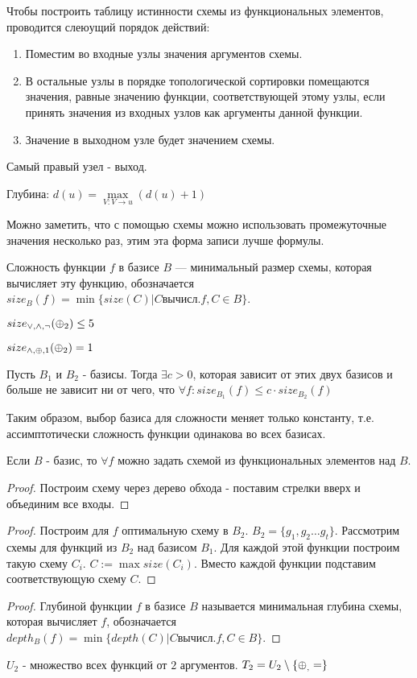 Чтобы построить таблицу истинности схемы из функциональных элементов, проводится слеюущий порядок действий:

\begin{enumerate}
\item Поместим во входные узлы значения аргументов схемы.
\item В остальные узлы в порядке топологической сортировки помещаются значения, равные значению функции, соответствующей этому узлы, если принять значения из входных узлов как аргументы данной функции.
\item Значение в выходном узле будет значением схемы.
\end{enumerate}


Самый правый узел - выход.

Глубина: $d(u)=\max\limits_{V:V\to u} (d(u)+1)$

Можно заметить, что с помощью схемы можно использовать промежуточные значения несколько раз, этим эта форма записи лучше формулы.

\begin{definition}
    Сложность функции $f$ в базисе $B$ --- минимальный размер схемы, которая вычисляет эту функцию, обозначается $size_B(f)=\min\{size(C)|C \text{вычисл.} f, C\in B\}$.
\end{definition}

$size_{\vee,\wedge,\neg}(\operatorname*{\oplus}_2)\leq 5$

$size_{\wedge,\operatorname*{\oplus},1}(\operatorname*{\oplus}_2)=1$

\begin{theorem}
    Пусть $B_1$ и $B_2$ - базисы. Тогда $\exists c>0$, которая зависит от этих двух базисов и больше не зависит ни от чего, что $\forall f : size_{B_1}(f)\leq c\cdot size_{B_2}(f)$
\end{theorem}

Таким образом, выбор базиса для сложности меняет только константу, т.е. ассимптотически сложность функции одинакова во всех базисах.

\begin{lemma}
    Если $B$ - базис, то $\forall f$ можно задать схемой из функциональных элементов над $B$.
\end{lemma}

\begin{proof}
    Построим схему через дерево обхода - поставим стрелки вверх и объединим все входы.
\end{proof}

\begin{proof}
    Построим для $f$ оптимальную схему в $B_2$. $B_2 =\{g_1,g_2\ldots g_t\}$. Рассмотрим схемы для функций из $B_2$ над базисом $B_1$. Для каждой этой функции построим такую схему $C_i$. $C:=\max size(C_i)$. Вместо каждой функции подставим соответствующую схему $C$.
\end{proof}

\begin{proof}
    Глубиной функции $f$ в базисе $B$ называется минимальная глубина схемы, которая вычисляет $f$, обозначается $depth_B(f)=\min\{depth(C)|C \text{вычисл.} f, C\in B\}$.
\end{proof}

$U_2$ - множество всех функций от $2$ аргументов.
$T_2=U_2\setminus \{\operatorname*{\oplus}_,=\}$


